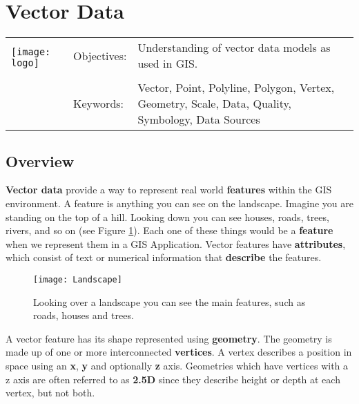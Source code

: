 

\section{Vector Data}\label{sec:vectordata}
\begin{tabular}{p{3.5cm}p{6cm}p{6cm}}
\multirow{2}{*}{\texttt{[image: logo]}} & Objectives: &
Understanding of vector data models as used in GIS. \\
& & \\
& Keywords: & 
Vector, Point, Polyline, Polygon, Vertex, Geometry, Scale, Data, Quality,
Symbology, Data Sources  \\
\hline
\end{tabular}

\subsection{Overview}

\textbf{Vector data} provide a way to represent real world \textbf{features}
within the GIS environment. A feature is anything you can see on the
landscape. Imagine you are standing on the top of a hill. Looking down you
can see houses, roads, trees, rivers, and so on (see Figure
\ref{fig:landscape}). Each one of these things would be a \textbf{feature}
when we represent them in a GIS Application. Vector features have
\textbf{attributes}, which consist of text or numerical information that
\textbf{describe} the features.

\begin{figure}[ht]
   \begin{center}
   \caption{Looking over a landscape you can see the main features, such
as roads, houses and trees.}
\label{fig:landscape}\smallskip
   \texttt{[image: Landscape]}
\end{center}
\end{figure}

A vector feature has its shape represented using \textbf{geometry}. The
geometry is made up of one or more interconnected \textbf{vertices}. A vertex
describes a position in space using an \textbf{x}, \textbf{y} and optionally
\textbf{z} axis. Geometries which have vertices with a z axis are often
referred to as \textbf{2.5D} since they describe height or depth at each
vertex, but not both.

